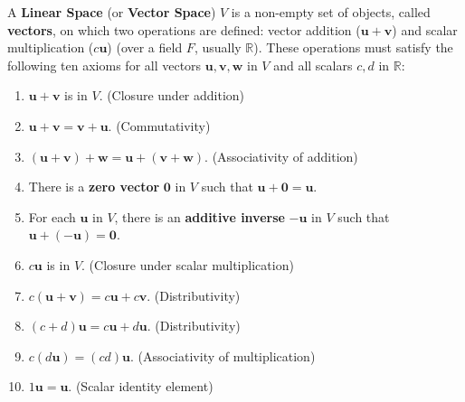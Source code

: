 \begin{definition}
A \textbf{Linear Space} (or \textbf{Vector Space}) $V$ is a non-empty set of objects, called \textbf{vectors}, on which two operations are defined: vector addition ($\mathbf{u} + \mathbf{v}$) and scalar multiplication ($c\mathbf{u}$) (over a field $F$, usually $\mathbb{R}$). These operations must satisfy the following ten axioms for all vectors $\mathbf{u}, \mathbf{v}, \mathbf{w}$ in $V$ and all scalars $c, d$ in $\mathbb{R}$:

\begin{enumerate}
    \item $\mathbf{u} + \mathbf{v}$ is in $V$. (Closure under addition)
    \item $\mathbf{u} + \mathbf{v} = \mathbf{v} + \mathbf{u}$. (Commutativity)
    \item $(\mathbf{u} + \mathbf{v}) + \mathbf{w} = \mathbf{u} + (\mathbf{v} + \mathbf{w})$. (Associativity of addition)
    \item There is a \textbf{zero vector} $\mathbf{0}$ in $V$ such that $\mathbf{u} + \mathbf{0} = \mathbf{u}$.
    \item For each $\mathbf{u}$ in $V$, there is an \textbf{additive inverse} $-\mathbf{u}$ in $V$ such that $\mathbf{u} + (-\mathbf{u}) = \mathbf{0}$.
    \item $c\mathbf{u}$ is in $V$. (Closure under scalar multiplication)
    \item $c(\mathbf{u} + \mathbf{v}) = c\mathbf{u} + c\mathbf{v}$. (Distributivity)
    \item $(c+d)\mathbf{u} = c\mathbf{u} + d\mathbf{u}$. (Distributivity)
    \item $c(d\mathbf{u}) = (cd)\mathbf{u}$. (Associativity of multiplication)
    \item $1\mathbf{u} = \mathbf{u}$. (Scalar identity element)
\end{enumerate}
\end{definition}

